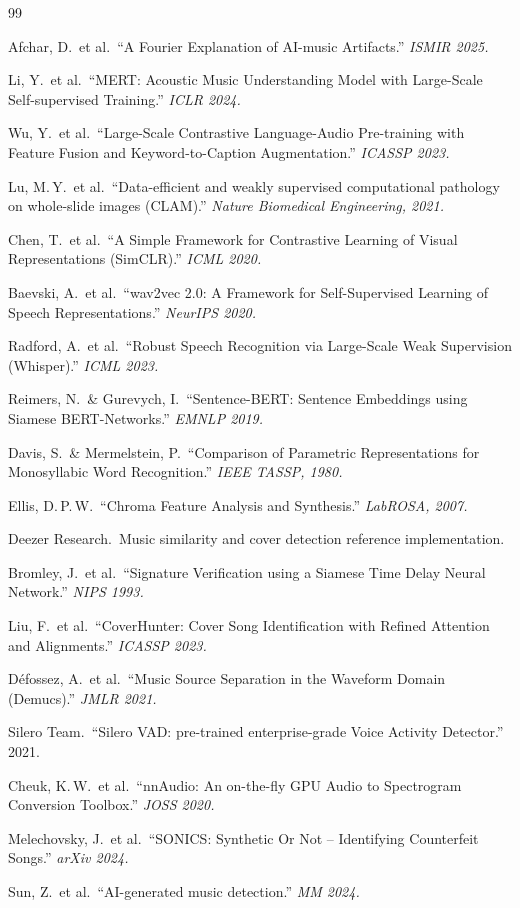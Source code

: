 \documentclass[11pt,a4paper]{article}
\begin{document}
\begin{thebibliography}{99}

 Afchar, D.\ et al.\ ``A Fourier Explanation of AI-music Artifacts.'' \textit{ISMIR 2025.}

 Li, Y.\ et al.\ ``MERT: Acoustic Music Understanding Model with Large-Scale Self-supervised Training.'' \textit{ICLR 2024.}

 Wu, Y.\ et al.\ ``Large-Scale Contrastive Language-Audio Pre-training with Feature Fusion and Keyword-to-Caption Augmentation.'' \textit{ICASSP 2023.}

 Lu, M.\,Y.\ et al.\ ``Data-efficient and weakly supervised computational pathology on whole-slide images (CLAM).'' \textit{Nature Biomedical Engineering, 2021.}

 Chen, T.\ et al.\ ``A Simple Framework for Contrastive Learning of Visual Representations (SimCLR).'' \textit{ICML 2020.}

 Baevski, A.\ et al.\ ``wav2vec 2.0: A Framework for Self-Supervised Learning of Speech Representations.'' \textit{NeurIPS 2020.}

 Radford, A.\ et al.\ ``Robust Speech Recognition via Large-Scale Weak Supervision (Whisper).'' \textit{ICML 2023.}

 Reimers, N.\ \& Gurevych, I.\ ``Sentence-BERT: Sentence Embeddings using Siamese BERT-Networks.'' \textit{EMNLP 2019.}

 Davis, S.\ \& Mermelstein, P.\ ``Comparison of Parametric Representations for Monosyllabic Word Recognition.'' \textit{IEEE TASSP, 1980.}

 Ellis, D.\,P.\,W.\ ``Chroma Feature Analysis and Synthesis.'' \textit{LabROSA, 2007.}

 Deezer Research.\ Music similarity and cover detection reference implementation.

 Bromley, J.\ et al.\ ``Signature Verification using a Siamese Time Delay Neural Network.'' \textit{NIPS 1993.}

 Liu, F.\ et al.\ ``CoverHunter: Cover Song Identification with Refined Attention and Alignments.'' \textit{ICASSP 2023.}

 D\'{e}fossez, A.\ et al.\ ``Music Source Separation in the Waveform Domain (Demucs).'' \textit{JMLR 2021.}

 Silero Team.\ ``Silero VAD: pre-trained enterprise-grade Voice Activity Detector.'' 2021.

 Cheuk, K.\,W.\ et al.\ ``nnAudio: An on-the-fly GPU Audio to Spectrogram Conversion Toolbox.'' \textit{JOSS 2020.}

 Melechovsky, J.\ et al.\ ``SONICS: Synthetic Or Not -- Identifying Counterfeit Songs.'' \textit{arXiv 2024.}

 Sun, Z.\ et al.\ ``AI-generated music detection.'' \textit{MM 2024.}

\end{thebibliography}
\end{document}
